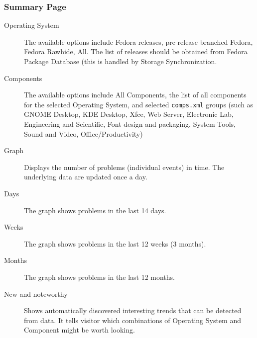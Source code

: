 \documentclass{article}
\begin{document}
\subsubsection{Summary Page}
\begin{center}
\end{center}

\begin{description}
\item[Operating System] The available options include Fedora releases,
  pre-release branched Fedora, Fedora Rawhide, All. The list of
  releases should be obtained from Fedora Package Database (this is
  handled by Storage Synchronization.
\item[Components] The available options include All Components, the
  list of all components for the selected Operating System, and
  selected \texttt{comps.xml} groups (such as GNOME Desktop, KDE
  Desktop, Xfce, Web Server, Electronic Lab, Engineering and
  Scientific, Font design and packaging, System Tools, Sound and
  Video, Office/Productivity)
\item[Graph] Displays the number of problems (individual events) in
  time. The underlying data are updated once a day.
\item[Days] The graph shows problems in the last 14 days.
\item[Weeks] The graph shows problems in the last 12 weeks (3 months).
\item[Months] The graph shows problems in the last 12 months.
\item[New and noteworthy] Shows automatically discovered interesting
  trends that can be detected from data.  It tells visitor which
  combinations of Operating System and Component might be worth
  looking.
\end{description}
\end{document}
